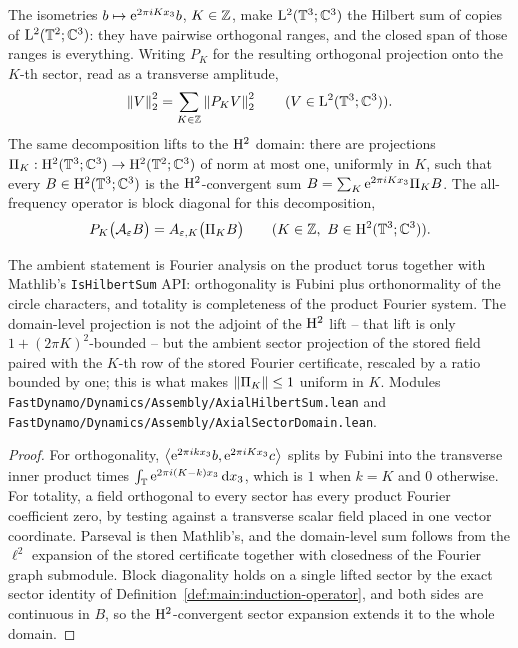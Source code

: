 \begin{lemma}
  \label{lem:dynamics:axial-hilbert-sum}
  \leanok
  The isometries $b\mapsto\mathrm{e}^{2\pi iKx_3}b $, $K\in\mathbb{Z} $, make $\mathrm{L}^2(\mathbb{T}^3;\mathbb{C}^3) $ the
  Hilbert sum of copies of $\mathrm{L}^2(\mathbb{T}^2;\mathbb{C}^3) $: they have pairwise orthogonal ranges, and
  the closed span of those ranges is everything.  Writing $P_K $ for the resulting
  orthogonal projection onto the $K $-th sector, read as a transverse amplitude,
  \[
    \left\|V\right\|_2^2=\sum_{K\in\mathbb{Z}}\left\|P_KV\right\|_2^2
    \qquad(V\in\mathrm{L}^2(\mathbb{T}^3;\mathbb{C}^3)).
  \]
  The same decomposition lifts to the $\mathrm{H}^2 $ domain: there are projections
  $\Pi_K:\mathrm{H}^2(\mathbb{T}^3;\mathbb{C}^3)\to\mathrm{H}^2(\mathbb{T}^2;\mathbb{C}^3) $ of norm at most one, uniformly in $K $,
  such that every $B\in\mathrm{H}^2(\mathbb{T}^3;\mathbb{C}^3) $ is the $\mathrm{H}^2 $-convergent sum
  $B=\sum_K\mathrm{e}^{2\pi iKx_3}\Pi_KB $.  The all-frequency operator is block diagonal for this
  decomposition,
  \[
    P_K\bigl(\mathcal A_\varepsilon B\bigr)=A_{\varepsilon,K}\bigl(\Pi_KB\bigr)
    \qquad(K\in\mathbb{Z},\ B\in\mathrm{H}^2(\mathbb{T}^3;\mathbb{C}^3)).
  \]
\end{lemma}

The ambient statement is Fourier analysis on the product torus together with Mathlib's
\texttt{IsHilbertSum} API: orthogonality is Fubini plus orthonormality of the circle
characters, and totality is completeness of the product Fourier system.  The domain-level
projection is not the adjoint of the $\mathrm{H}^2 $ lift -- that lift is only
$1+(2\pi K)^2 $-bounded -- but the ambient sector projection of the stored field paired with
the $K $-th row of the stored Fourier certificate, rescaled by a ratio bounded by one; this
is what makes $\left\|\Pi_K\right\|\leq1 $ uniform in $K $.  Modules
\texttt{FastDynamo/Dynamics/Assembly/AxialHilbertSum.lean} and
\texttt{FastDynamo/Dynamics/Assembly/AxialSectorDomain.lean}.

\begin{proof}
  \leanok
  For orthogonality, $\left\langle\mathrm{e}^{2\pi ikx_3}b,\mathrm{e}^{2\pi iKx_3}c\right\rangle $ splits by Fubini into the
  transverse inner product times $\int_{\mathbb{T}}\mathrm{e}^{2\pi i(K-k)x_3}\,\mathrm{d} x_3 $, which is $1 $ when
  $k=K $ and $0 $ otherwise.  For totality, a field orthogonal to every sector has every
  product Fourier coefficient zero, by testing against a transverse scalar field placed in
  one vector coordinate.  Parseval is then Mathlib's, and the domain-level sum follows from
  the $\ell^2 $ expansion of the stored certificate together with closedness of the Fourier
  graph submodule.  Block diagonality holds on a single lifted sector by the exact sector
  identity of Definition~\ref{def:main:induction-operator}, and both sides are continuous in
  $B $, so the $\mathrm{H}^2 $-convergent sector expansion extends it to the whole domain.
\end{proof}

